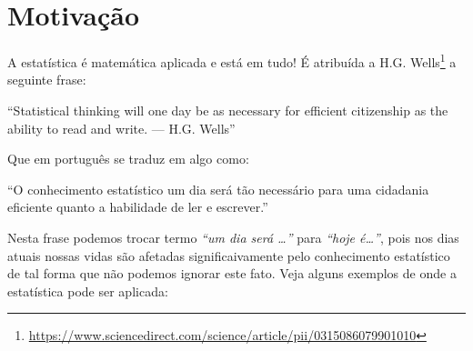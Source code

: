 \documentclass[11pt,]{style/krantz}
\renewenvironment{quote}{\begin{VF}}{\end{VF}}
\renewcommand{\href}[2]{#2\footnote{\url{#1}}}
\theoremstyle{definition}
\theoremstyle{definition}
\theoremstyle{definition}
\theoremstyle{remark}
\begin{document}
\hypertarget{motivacao}{%
\section*{Motivação}\label{motivacao}}


A estatística é matemática aplicada e está em tudo! É atribuída a \href{https://www.sciencedirect.com/science/article/pii/0315086079901010}{H.G. Wells} a seguinte frase:

\begin{quote}
``Statistical thinking will one day be as necessary for efficient citizenship as the ability to read and write. --- H.G. Wells''
\end{quote}

Que em português se traduz em algo como:

\begin{quote}
``O conhecimento estatístico um dia será tão necessário para uma cidadania eficiente quanto a habilidade de ler e escrever.''
\end{quote}

Nesta frase podemos trocar termo \emph{``um dia será \ldots{}''} para \emph{``hoje é\ldots{}''}, pois nos dias atuais nossas vidas são afetadas significaivamente pelo conhecimento estatístico de tal forma que não podemos ignorar este fato. Veja alguns exemplos de onde a estatística pode ser aplicada:
\end{document}
